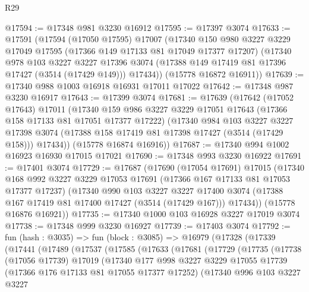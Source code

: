 \begin{lexlean}{R29}
\begin{coremodule}
@17594 := @17348 @981 @3230 @16912
@17595 := @17397 @3074
@17633 := @17591
    (@17594
      (@17050 @17595)
      @17007
      (@17340
        @150
        @980
        @3227
        @3229
        @17049
        @17595
        (@17366 @149 @17133 @81 @17049 @17377 @17207)
        (@17340
          @978
          @103
          @3227
          @3227
          @17396
          @3074
          (@17388 @149 @17419 @81 @17396 @17427 (@3514 (@17429 @149)))
          @17434))
      (@15778 @16872 @16911))
@17639 := @17340 @988 @1003 @16918 @16931 @17011 @17022
@17642 := @17348 @987 @3230 @16917
@17643 := @17399 @3074
@17681 := @17639
    (@17642
      (@17052 @17643)
      @17011
      (@17340
        @159
        @986
        @3227
        @3229
        @17051
        @17643
        (@17366 @158 @17133 @81 @17051 @17377 @17222)
        (@17340
          @984
          @103
          @3227
          @3227
          @17398
          @3074
          (@17388 @158 @17419 @81 @17398 @17427 (@3514 (@17429 @158)))
          @17434))
      (@15778 @16874 @16916))
@17687 := @17340 @994 @1002 @16923 @16930 @17015 @17021
@17690 := @17348 @993 @3230 @16922
@17691 := @17401 @3074
@17729 := @17687
    (@17690
      (@17054 @17691)
      @17015
      (@17340
        @168
        @992
        @3227
        @3229
        @17053
        @17691
        (@17366 @167 @17133 @81 @17053 @17377 @17237)
        (@17340
          @990
          @103
          @3227
          @3227
          @17400
          @3074
          (@17388 @167 @17419 @81 @17400 @17427 (@3514 (@17429 @167)))
          @17434))
      (@15778 @16876 @16921))
@17735 := @17340 @1000 @103 @16928 @3227 @17019 @3074
@17738 := @17348 @999 @3230 @16927
@17739 := @17403 @3074
@17792 := fun (hash : @3035) =>
  fun (block : @3085) =>
  @16979
    (@17328
      (@17339
        (@17441
          (@17489
            (@17537
              (@17585
                (@17633
                  (@17681
                    (@17729
                      (@17735
                        (@17738
                          (@17056 @17739)
                          @17019
                          (@17340
                            @177
                            @998
                            @3227
                            @3229
                            @17055
                            @17739
                            (@17366 @176 @17133 @81 @17055 @17377 @17252)
                            (@17340
                              @996
                              @103
                              @3227
                              @3227

\end{coremodule}
\end{lexlean}
